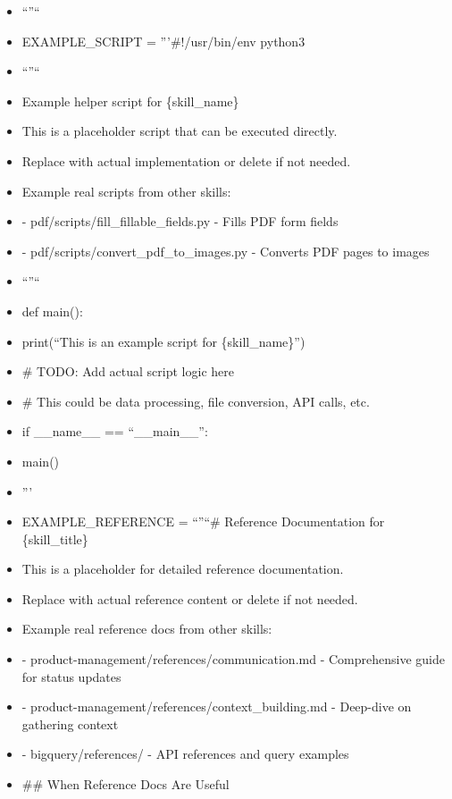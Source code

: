 \documentclass[11pt]{article}
\begin{document}
\begin{itemize}[leftmargin=*,itemsep=2pt,topsep=2pt]
\item {} ``''``
\item {} EXAMPLE\_\allowbreak{}SCRIPT = '''\#!/usr/bin/env python3
\item {} ``''``
\item {} Example helper script for \{skill\_\allowbreak{}name\}
\item {} This is a placeholder script that can be executed directly.
\item {} Replace with actual implementation or delete if not needed.
\item {} Example real scripts from other skills:
\item {} - pdf/scripts/fill\_\allowbreak{}fillable\_\allowbreak{}fields.py - Fills PDF form fields
\item {} - pdf/scripts/convert\_\allowbreak{}pdf\_\allowbreak{}to\_\allowbreak{}images.py - Converts PDF pages to images
\item {} ``''``
\item {} def main():
\item {} print(``This is an example script for \{skill\_\allowbreak{}name\}'')
\item {} \# TODO: Add actual script logic here
\item {} \# This could be data processing, file conversion, API calls, etc.
\item {} if \_\allowbreak{}\_\allowbreak{}name\_\allowbreak{}\_\allowbreak{} == ``\_\allowbreak{}\_\allowbreak{}main\_\allowbreak{}\_\allowbreak{}'':
\item {} main()
\item {} '''
\item {} EXAMPLE\_\allowbreak{}REFERENCE = ``''``\# Reference Documentation for \{skill\_\allowbreak{}title\}
\item {} This is a placeholder for detailed reference documentation.
\item {} Replace with actual reference content or delete if not needed.
\item {} Example real reference docs from other skills:
\item {} - product-management/references/communication.md - Comprehensive guide for status updates
\item {} - product-management/references/context\_\allowbreak{}building.md - Deep-dive on gathering context
\item {} - bigquery/references/ - API references and query examples
\item {} \#\# When Reference Docs Are Useful

\end{itemize}
\end{document}
